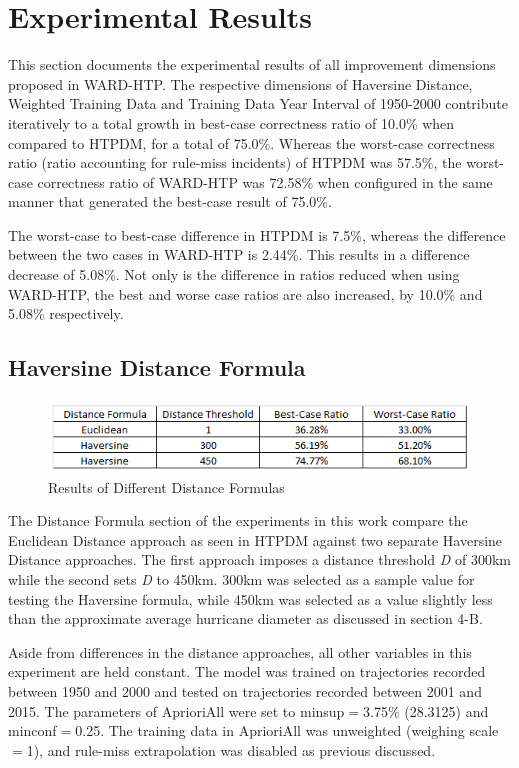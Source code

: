\documentclass[12pt,conference]{IEEEtran}
\begin{document}
\section{Experimental Results}

This section documents the experimental results of all improvement dimensions proposed in WARD-HTP. The respective dimensions of Haversine Distance, Weighted Training Data and Training Data Year Interval of 1950-2000 contribute iteratively to a total growth in best-case correctness ratio of 10.0\% when compared to HTPDM, for a total of 75.0\%. Whereas the worst-case correctness ratio (ratio accounting for rule-miss incidents) of HTPDM was 57.5\%, the worst-case correctness ratio of WARD-HTP was 72.58\% when configured in the same manner that generated the best-case result of 75.0\%. 

The worst-case to best-case difference in HTPDM is 7.5\%, whereas the difference between the two cases in WARD-HTP is 2.44\%. This results in a difference decrease of 5.08\%. Not only is the difference in ratios reduced when using WARD-HTP, the best and worse case ratios are also increased, by 10.0\% and 5.08\% respectively.

\subsection{Haversine Distance Formula}
\begin{figure}[!bp]
\centering
\includegraphics[scale=1.0]{Distance-Formula-Results}
\caption{Results of Different Distance Formulas}
\end{figure}

The Distance Formula section of the experiments in this work compare the Euclidean Distance approach as seen in HTPDM against two separate Haversine Distance approaches. The first approach imposes a distance threshold \textit{D} of 300km while the second sets \textit{D} to 450km. 300km was selected as a sample value for testing the Haversine formula, while 450km was selected as a value slightly less than the approximate average hurricane diameter as discussed in section 4-B. 

Aside from differences in the distance approaches, all other variables in this experiment are held constant. The model was trained on trajectories recorded between 1950 and 2000 and tested on trajectories recorded between 2001 and 2015. The parameters of AprioriAll were set to minsup$=$3.75\% (28.3125) and minconf$=$0.25. The training data in AprioriAll was unweighted (weighing scale$=$1), and rule-miss extrapolation was disabled as previous discussed.
\end{document}
